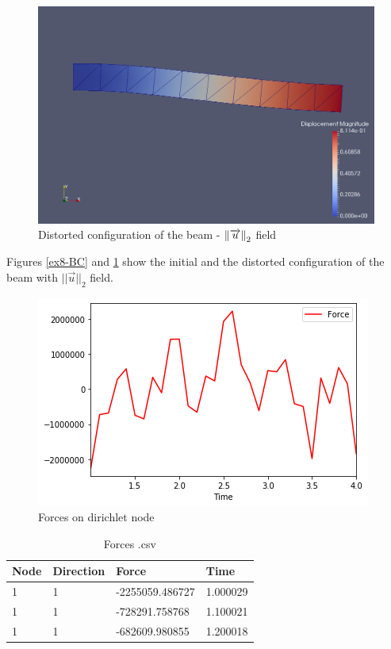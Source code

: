 \documentclass[oneside,11pt,times]{book}
\begin{document}
\begin{figure}[h!]
    \centering
    \includegraphics[scale=0.28]{imgs/Examples/ex8-disp.png}
    \caption{Distorted configuration of the beam - $\left\lVert \protect\overrightarrow{u}\right\rVert_2$ field}
    \label{ex8-disp}
\end{figure}
Figures \ref{ex8-BC} and \ref{ex8-disp} show the initial and the distorted configuration of the beam with $||\overrightarrow{u}||_2$ field.\\



\begin{figure}[h!]
    \centering
    \includegraphics[scale=0.7]{imgs/Examples/ex8-forces.png}
    \caption{Forces on dirichlet node}
    \label{ex8-forces}
\end{figure}

\begin{table}[h!]
\centering
\caption{Forces .csv}
\label{ex8-forces-table}
\vspace{0.5cm}
\begin{tabular}{|l|l|l|l|}
\hline
Node & Direction & Force           & Time      \\
\hline
1    & 1         & -2255059.486727 & 1.000029  \\
\hline
1    & 1         & -728291.758768  & 1.100021  \\
\hline
1    & 1         & -682609.980855  & 1.200018  \\
\hline
\end{tabular}
\end{table}
\end{document}
